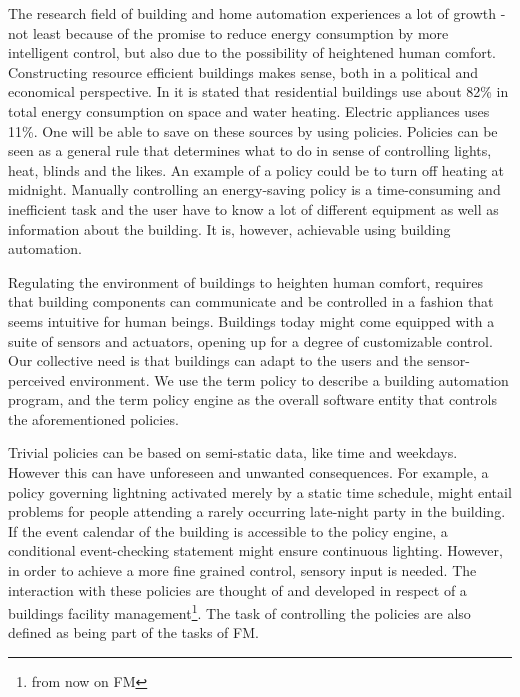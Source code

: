 The research field of building and home automation experiences a lot of growth - not least because of the promise to reduce energy consumption by more intelligent control, but also due to the possibility of heightened human comfort. Constructing resource efficient buildings makes sense, both in a political and economical perspective. In \cite{janssen2004towards} it is stated that residential buildings use about 82\% in total energy consumption on space and water heating. Electric appliances uses 11\%. One will be able to save on these sources by using policies. Policies can be seen as a general rule that determines what to do in sense of controlling lights, heat, blinds and the likes. An example of a policy could be to turn off heating at midnight. Manually controlling an energy-saving policy is a time-consuming and inefficient task and the user have to know a lot of different equipment as well as information about the building. It is, however, achievable using building automation. 

Regulating the environment of buildings to heighten human comfort, 
requires that building components can communicate and be controlled in a fashion that seems intuitive for human beings. Buildings today might come equipped with a suite of sensors and actuators, opening up for a degree of customizable control. Our collective need is that buildings can adapt to the users and the sensor-perceived environment. We use the term policy to describe a building automation program, and the term policy engine as the overall software entity that controls the aforementioned policies.


Trivial policies can be based on semi-static data, like time and weekdays. However this can have unforeseen and unwanted consequences. For example, a policy governing lightning activated merely by a static time schedule, might entail problems for people attending a rarely occurring late-night party in the building. If the event calendar of the building is accessible to the policy engine, a conditional event-checking statement might ensure continuous lighting. However, in order to achieve a more fine grained control, sensory input is needed. The interaction with these policies are thought of and developed in respect of a buildings facility management\footnote{from now on FM}. The task of controlling the policies are also defined as being part of the tasks of FM.

